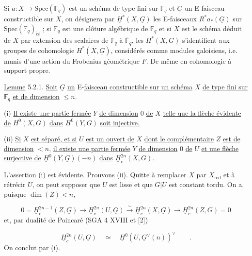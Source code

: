 
Si $a : X \longrightarrow \mathrm{Spec}(\mathbb{F}_q)$ est un schéma de type fini sur $\mathbb{F}_q$ et $\underline{G}$ un E-faisceau constructible sur $X$, on désignera par $\underline{H}^*(X,\underline{G})$ les E-faisceaux $R^*a_*(\underline{G})$ sur $\mathrm{Spec}(\mathbb{F}_q)_{\acute{e}t}$ ; si $\overline{\mathbb{F}}_q$ est une clôture algébrique de $\mathbb{F}_q$ et si $\overline{X}$ est le schéma déduit de $X$ par extension des scalaires de $\mathbb{F}_q$ à $\overline{\mathbb{F}}_q$, les $\underline{H}^*(X,\underline{G})$ s'identifient aux groupes de cohomologie $H^*(\overline{X},\underline{G})$, considérés comme modules galoisiens, i.e. munis d'une action du Frobenius géométrique $F$. De même en cohomologie à support propre.

\underline{Lemme} 5.2.1. \underline{Soit} $\underline{G}$ \underline{un} E-\underline{faisceau constructible sur un schéma} $X$ \underline{de type fini sur} $\mathbb{F}_q$ \underline{et de dimension} $\leq n$.

(i) \underline{Il existe une partie fermée} $Y$ \underline{de dimension} $0$ \underline{de} $X$ \underline{telle que la flèche évidente de} $\underline{H}^0(X,\underline{G})$ \underline{dans} $\underline{H}^0(Y,\underline{G})$ \underline{soit injective.}

(ii) \underline{Si} $X$ \underline{est séparé, et si} $U$ \underline{est un ouvert de} $X$ \underline{dont le complémentaire} $Z$ \underline{est de dimension} $< n$, \underline{il existe une partie fermée} $Y$ \underline{de dimension} $0$ \underline{de} $U$ \underline{et une flèche surjective de} $\underline{H}^0(Y,\underline{G})(-n)$ \underline{dans} $\underline{H}^{2n}_c(X,G)$.

L'assertion (i) est évidente. Prouvons (ii). Quitte à remplacer $X$ par $X_{\mathrm{red}}$ et à rétrécir $U$, on peut supposer que $U$ est lisse et que $G|U$ est constant tordu. On a, puisque $\dim(Z) < n$,

\begin{equation*}
0 = \underline{H}^{2n-1}_c(Z,\underline{G}) \longrightarrow \underline{H}^{2n}_c(U,\underline{G}) \stackrel{\sim}{\longrightarrow} \underline{H}^{2n}_c(X,\underline{G}) \longrightarrow \underline{H}^{2n}_c(Z,G) = 0
\end{equation*}
et, par dualité de Poincaré (SGA 4 XVIII et [2])

\begin{equation*}
\underline{H}^{2n}_c(U,\underline{G}) \quad \simeq \quad \underline{H}^0(U,\underline{G}^{\vee}(n))^{\vee} \qquad .
\end{equation*}
On conclut par (i).


